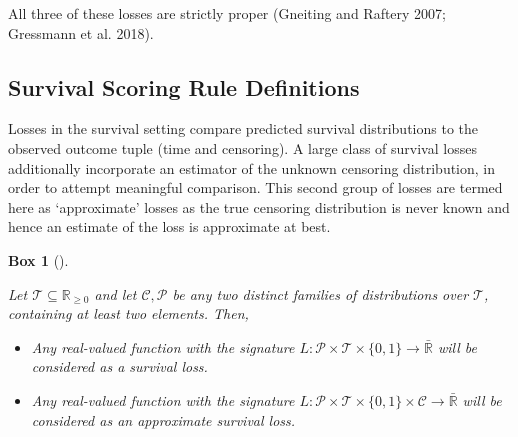 \documentclass[
  letterpaper,
]{scrbook}
\providecommand{\tightlist}{%
  \setlength{\itemsep}{0pt}\setlength{\parskip}{0pt}}\usepackage{longtable,booktabs,array}
\theoremstyle{plain}
\newtheorem{conjecture}{Box}[chapter]
\theoremstyle{definition}
\theoremstyle{remark}
\begin{document}
All three of these losses are strictly proper (Gneiting and Raftery
2007; Gressmann et al. 2018).

\hypertarget{sec-eval-distr-score-surv}{%
\subsection{Survival Scoring Rule
Definitions}\label{sec-eval-distr-score-surv}}

Losses in the survival setting compare predicted survival distributions
to the observed outcome tuple (time and censoring). A large class of
survival losses additionally incorporate an estimator of the unknown
censoring distribution, in order to attempt meaningful comparison. This
second group of losses are termed here as `approximate' losses as the
true censoring distribution is never known and hence an estimate of the
loss is approximate at best.

\begin{tcolorbox}[enhanced jigsaw, title={Survival loss}, breakable, leftrule=.75mm, rightrule=.15mm, opacityback=0, coltitle=black, colback=white, toptitle=1mm, toprule=.15mm, bottomtitle=1mm, titlerule=0mm, arc=.35mm, bottomrule=.15mm, colbacktitle=quarto-callout-note-color!10!white, left=2mm, opacitybacktitle=0.6, colframe=quarto-callout-note-color-frame]

\leavevmode{}%
\begin{conjecture}[]\label{cnj-loss-surv}

Let \(\mathcal{T}\subseteq \mathbb{R}_{\geq 0}\) and let
\(\mathcal{C}, \mathcal{P}\) be any two distinct families of
distributions over \(\mathcal{T}\), containing at least two elements.
Then,

\begin{itemize}
\tightlist
\item
  Any real-valued function with the signature
  \(L: \mathcal{P}\times \mathcal{T}\times \{0,1\}\rightarrow \bar{\mathbb{R}}\)
  will be considered as a \emph{survival loss}.
\item
  Any real-valued function with the signature
  \(L: \mathcal{P}\times \mathcal{T}\times \{0,1\}\times \mathcal{C}\rightarrow \bar{\mathbb{R}}\)
  will be considered as an \emph{approximate survival loss}.
\end{itemize}

\end{conjecture}

\end{tcolorbox}
\end{document}

